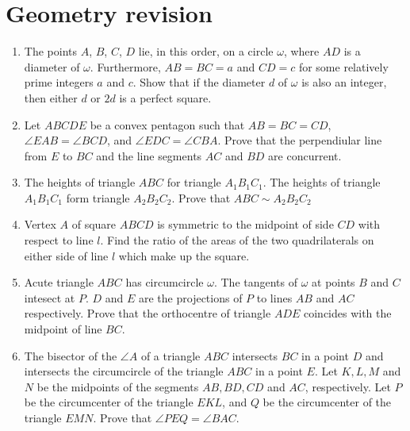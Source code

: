 \documentclass{article}
\begin{document}
\section{Geometry revision}
\begin{enumerate}
  \item %
  The points $A$, $B$, $C$, $D$ lie, in this order, on a circle $\omega$, where $AD$ is a diameter of $\omega$. Furthermore, $AB = BC = a$ and $CD = c$ for some relatively prime integers $a$ and $c$. Show that if the diameter $d$ of $\omega$ is also an integer, then either $d$ or $2d$ is a perfect square.

  \item %
  Let $ABCDE$ be a convex pentagon such that $AB = BC = CD$, $\angle EAB =  \angle BCD$, and $\angle EDC = \angle CBA$. Prove that the perpendiular line from $E$ to $BC$ and the line segments $AC$ and $BD$ are concurrent.

  \item %
  The heights of triangle $ABC$ for triangle $A_1B_1C_1$. The heights of triangle $A_1B_1C_1$ form triangle $A_2B_2C_2$. Prove that $ABC \sim A_2B_2C_2$

  \item %
  Vertex $A$ of square $ABCD$ is symmetric to the midpoint of side $CD$ with respect to line $l$. Find the ratio of the areas of the two quadrilaterals on either side of line $l$ which make up the square.

  \item %
  Acute triangle $ABC$ has circumcircle $\omega$. The tangents of $\omega$ at points $B$ and $C$ intesect at $P$. $D$ and $E$ are the projections of $P$ to lines $AB$ and $AC$ respectively. Prove that the orthocentre of triangle $ADE$ coincides with the midpoint of line $BC$.

  \item %
  The bisector of the $\angle A$ of a triangle $ABC$ intersects $BC$ in a point $D$ and intersects the circumcircle of the triangle $ABC$ in a point $E$. Let $K, L, M$ and $N$ be the midpoints of the segments $AB, BD, CD$ and $AC$, respectively. Let $P$ be the circumcenter of the triangle $EKL$, and $Q$ be the circumcenter of the triangle $EMN$. Prove that $\angle PEQ = \angle BAC$.


\end{enumerate}
\end{document}

